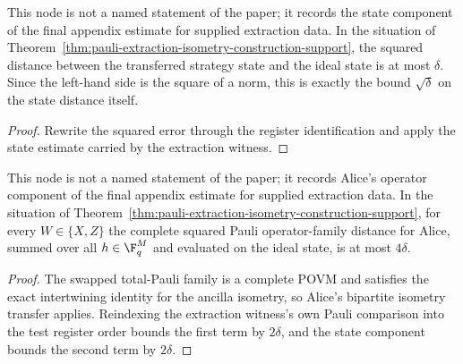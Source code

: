 \begin{example}
  \label{lem:pauli-extraction-state-distance-support}
  \leanok
  This node is not a named statement of the paper; it records the state
  component of the final appendix estimate for supplied extraction data. In
  the situation of
  Theorem~\ref{thm:pauli-extraction-isometry-construction-support}, the
  squared distance between the transferred strategy state and the ideal state
  is at most $\delta$. Since the left-hand side is the square of a norm, this
  is exactly the bound $\sqrt\delta$ on the state distance itself.
\end{example}
\begin{proof}
  \leanok
  Rewrite the squared error through the register identification and apply the
  state estimate carried by the extraction witness.
\end{proof}

\begin{theorem}
  \label{thm:pauli-extraction-alice-distance-support}
  \leanok
  This node is not a named statement of the paper; it records Alice's operator
  component of the final appendix estimate for supplied extraction data. In
  the situation of
  Theorem~\ref{thm:pauli-extraction-isometry-construction-support}, for every
  $W\in\{X,Z\}$ the complete squared Pauli operator-family distance for Alice,
  summed over all $h\in\F_q^M$ and evaluated on the ideal state, is at most
  $4\delta$.
\end{theorem}
\begin{proof}
  \leanok
  The swapped total-Pauli family is a complete POVM and satisfies the exact
  intertwining identity for the ancilla isometry, so Alice's bipartite
  isometry transfer applies. Reindexing the extraction witness's own Pauli
  comparison into the test register order bounds the first term by $2\delta$,
  and the state component bounds the second term by $2\delta$.
\end{proof}

